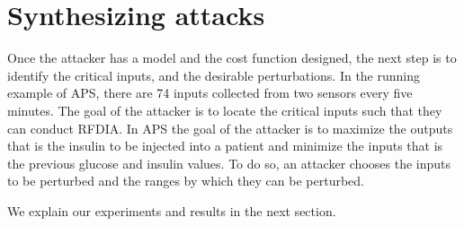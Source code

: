 \section{Synthesizing attacks}
Once the attacker has a model and the cost function designed, the next step is to identify the critical inputs, and the desirable perturbations.
In the running example of APS, there are 74 inputs collected from two sensors every five minutes.
 The goal of the attacker is to locate the critical inputs such that they can conduct \ac{RFDIA}.
 In \ac{APS} the goal of the attacker is to maximize the outputs that is the insulin to be injected into a patient and minimize the inputs that is the previous glucose and insulin values. 
 To do so, an attacker chooses the inputs to be perturbed and the ranges by which they can be perturbed.  
 
 
 
We explain our experiments and results in the next section. 


